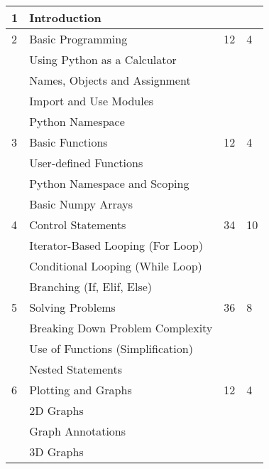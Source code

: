 \begin{longtable}{|p{2.0cm}|p{7.6cm}|p{2.0cm}|p{1.8cm}|}
             1  & Introduction                               &    &    \\
             \hline
             2  & Basic Programming                          & 12 & 4  \\
                & \qquad Using Python as a Calculator        &    &    \\
                & \qquad Names, Objects and Assignment       &    &    \\
                & \qquad Import and Use Modules              &    &    \\
                & \qquad Python Namespace                    &    &    \\
             \hline
             3  & Basic Functions                            & 12 & 4  \\
                & \qquad User-defined Functions              &    &    \\
                & \qquad Python Namespace and Scoping        &    &    \\
                & \qquad Basic Numpy Arrays                  &    &    \\
             \hline
             4  & Control Statements                         & 34 & 10 \\
                & \qquad Iterator-Based Looping (For Loop)   &    &    \\
                & \qquad Conditional Looping (While Loop)    &    &    \\
                & \qquad Branching (If, Elif, Else)          &    &    \\
             \hline
             5  & Solving Problems                           & 36 & 8  \\
                & \qquad Breaking Down Problem Complexity    &    &    \\
                & \qquad Use of Functions (Simplification)   &    &    \\
                & \qquad Nested Statements                   &    &    \\
             \hline
             6  & Plotting and Graphs                        & 12 & 4  \\
                & \qquad 2D Graphs                           &    &    \\
                & \qquad Graph Annotations                   &    &    \\
                & \qquad 3D Graphs                           &    &    \\

\end{longtable}

